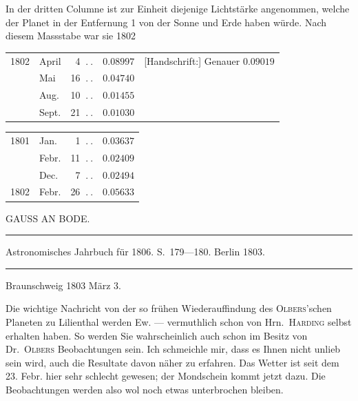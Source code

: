 In der dritten Columne ist zur Einheit diejenige Lichtstärke angenommen, welche der Planet in der Entfernung 1 von der Sonne und Erde haben würde. Nach diesem Massstabe war sie 1802
\begin{center}
\begingroup\small
\begin{tabular}{llr r l}
1802&April&4 $\ .\ .$&$0.08997$&[Handschrift:] Genauer $0.09019$\\
&Mai&16 $\ .\ .$&$0.04740$&\\
&Aug.&10 $\ .\ .$&$0.01455$&\\
&Sept.&21 $\ .\ .$&$0.01030$&
\end{tabular}\par\medskip
\begin{tabular}{llr r}
1801&Jan.&1 $\ .\ .$&$0.03637$\\
&Febr.&11 $\ .\ .$&$0.02409$\\
&Dec.&7 $\ .\ .$&$0.02494$\\
1802&Febr.&26 $\ .\ .$&$0.05633$
\end{tabular}\endgroup
\end{center}
\begin{flushright}\end{flushright}

\bigskip{}
\begin{center}
GAUSS AN BODE.\par
\medskip\hrule\medskip
Astronomisches Jahrbuch für 1806. S.\ 179—180. Berlin 1803.\par
\medskip\hrule
\end{center}\medskip
\begin{flushright}Braunschweig 1803 März 3.\end{flushright}

Die wichtige Nachricht von der so frühen Wiederauffindung des \textsc{Olbers}'schen Planeten zu Lilienthal werden Ew. — vermuthlich schon von Hrn.\ \textsc{Harding} selbst erhalten haben. So werden Sie wahrscheinlich auch schon im Besitz von Dr.\ \textsc{Olbers} Beobachtungen sein. Ich schmeichle mir, dass es Ihnen nicht unlieb sein wird, auch die Resultate davon näher zu erfahren. Das Wetter ist seit dem 23. Febr. hier sehr schlecht gewesen; der Mondschein kommt jetzt dazu. Die Beobachtungen werden also wol noch etwas unterbrochen bleiben.

